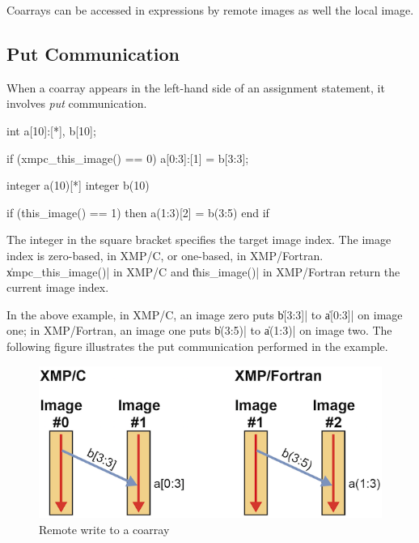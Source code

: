 Coarrays can be accessed in expressions by remote images as well the
local image.


\subsection{Put Communication}

When a coarray appears in the left-hand side of an
assignment statement, it involves {\it put} communication.

\begin{XCexample}
int a[10]:[*], b[10];

if (xmpc_this_image() == 0)
  a[0:3]:[1] = b[3:3];
\end{XCexample}

\begin{XFexample}
integer a(10)[*]
integer b(10)

if (this_image() == 1) then
  a(1:3)[2] = b(3:5)
end if
\end{XFexample}

The integer in the square bracket specifies the target image index. The
image index is zero-based, in XMP/C, or one-based, in
XMP/Fortran. \|xmpc_this_image()| in XMP/C and \|this_image()| in
XMP/Fortran return the current image index.



In the above example, in XMP/C, an image zero puts \|b[3:3]| to
\|a[0:3]| on image one; in XMP/Fortran, an image one puts \|b(3:5)| to
\|a(1:3)| on image two. The following figure illustrates the put
communication performed in the example.

\begin{figure}
  \centering
  \includegraphics[width=\textwidth]{figs/put.png}
  \caption{Remote write to a coarray}
\end{figure}

